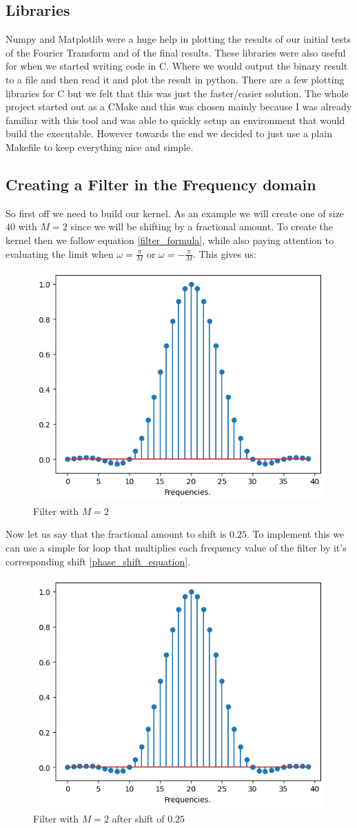 \documentclass[]{usiinfbachelorproject}
\begin{document}
	\subsection{Libraries}
		Numpy and Matplotlib were a huge help in plotting the results of our initial tests of the Fourier Transform and of the final results. These libraries were also useful for when we started writing code in C. Where we would output the binary result to a file and then read it and plot the result in python. There are a few plotting libraries for C but we felt that this was just the faster/easier solution.
		The whole project started out as a CMake and this was chosen mainly because I was already familiar with this tool and was able to quickly setup an environment that would build the executable. However towards the end we decided to just use a plain Makefile to keep everything nice and simple.
		
		\subsection{Creating a Filter in the Frequency domain}
		So first off we need to build our kernel. As an example we will create one of size $40$ with $M=2$ since we will be shifting by a fractional amount. To create the kernel then we follow equation \ref{filter_formula}, while also paying attention to evaluating the limit when $\omega=\frac{\pi}{M}$ or $\omega=-\frac{\pi}{M}$. This gives us:
		\begin{figure}[h]
			\centering
			\includegraphics[width=0.4\columnwidth]{images/filter_m_2.png}
			\caption{Filter with $M=2$}
			\label{original_filter}
		\end{figure}
		
		
		
		Now let us say that the fractional amount to shift is $0.25$. To implement this we can use a simple for loop that multiplies each frequency value of the filter by it's corresponding shift \ref{phase_shift_equation}.
		\begin{figure}[h]
			\centering
			\includegraphics[width=0.4\columnwidth]{images/filter_m_2_25_shift.png}
			\caption{Filter with $M=2$ after shift of $0.25$}
			\label{shifted_filter}
		\end{figure}
		
\end{document}
